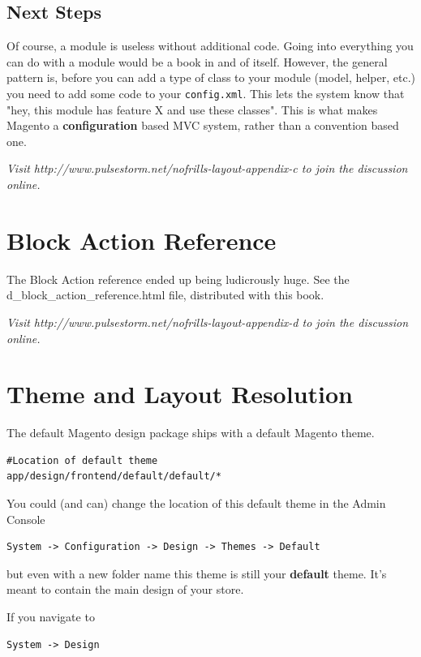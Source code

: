 \documentclass[oneside]{book}
\begin{document}
\section{Next Steps}

Of course, a module is useless without additional code. Going into everything you can do with a module would be a book in and of itself.  However, the general pattern is, before you can add a type of class to your module (model, helper, etc.) you need to add some code to your \footnotesize\texttt{config.xml}\normalsize.  This lets the system know that "hey, this module has feature X and use these classes".  This is what makes Magento a \textbf{configuration} based MVC system, rather than a convention based one.

\emph{Visit http://www.pulsestorm.net/nofrills-layout-appendix-c to join the discussion online.}
\chapter{Block Action Reference}
The Block Action reference ended up being ludicrously huge.  See the  d\_block\_action\_reference.html file, distributed with this book.

\emph{Visit http://www.pulsestorm.net/nofrills-layout-appendix-d to join the discussion online.}
\chapter{Theme and Layout Resolution}
The default Magento design package ships with a default Magento theme.  

\begin{lstlisting}
#Location of default theme
app/design/frontend/default/default/*

\end{lstlisting}


You could (and can) change the location of this default theme in the Admin Console

\begin{lstlisting}
System -> Configuration -> Design -> Themes -> Default

\end{lstlisting}


but even with a new folder name this theme is still your \textbf{default} theme.  It's meant to contain the main design of your store.  

If you navigate to 

\begin{lstlisting}
System -> Design

\end{lstlisting}
\end{document}
